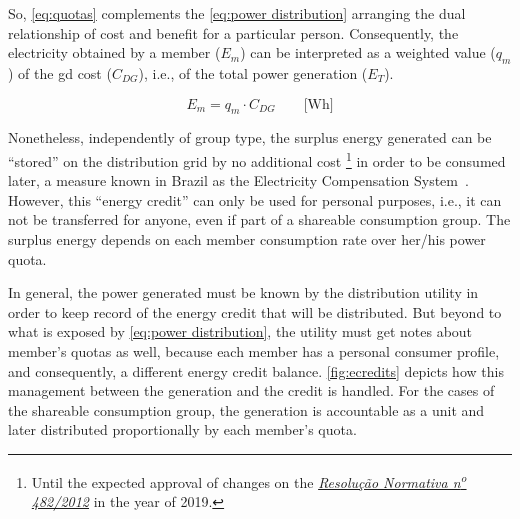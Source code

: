 So, \autoref{eq:quotas} complements the \autoref{eq:power distribution} arranging the dual relationship of cost and benefit for a particular person.
Consequently, the electricity obtained by a member ($E_{m}$) can be interpreted as a weighted value ($q_{m}$) of the \gls{gd} cost ($C_{DG}$), i.e., of the total power generation ($E_{T}$).

\begin{equation}\label{eq:quotas}
    E_{m} = q_{m} \cdot C_{DG} \qquad \text{[Wh]}
\end{equation}

Nonetheless, independently of group type,
the surplus energy generated can be ``stored'' on the distribution grid by no additional cost%
\footnote{Until the expected approval of changes on the \href{http://www.aneel.gov.br/audiencias-publicas?p_auth=pWIuCaW3&p_p_id=audienciaspublicasvisualizacao_WAR_AudienciasConsultasPortletportlet&p_p_lifecycle=1&p_p_state=normal&p_p_mode=view&p_p_col_id=column-2&p_p_col_count=1&_audienciaspublicasvisualizacao_WAR_AudienciasConsultasPortletportlet_audienciaId=2301&_audienciaspublicasvisualizacao_WAR_AudienciasConsultasPortletportlet_javax.portlet.action=visualizarAudiencia}{\emph{Resolução Normativa n\textsuperscript{o} 482/2012}} in the year of 2019.}
in order to be consumed later, a measure known in Brazil as the Electricity Compensation System~\cite{FAQ}. %
However, this ``energy credit'' can only be used for personal purposes, i.e., it can not be transferred for anyone, even if part of a shareable consumption group.
The surplus energy depends on each member consumption rate over her/his power quota.

In general, the power generated must be known by the distribution utility in order to keep record of the energy credit that will be distributed.
But beyond to what is exposed by \autoref{eq:power distribution}, the utility must get notes about member's quotas as well, because each member has a personal consumer profile, and consequently, a different energy credit balance.
\autoref{fig:ecredits} depicts how this management between the generation and the credit is handled.
For the cases of the shareable consumption group, the generation is accountable as a unit and later distributed proportionally by each member's quota.




